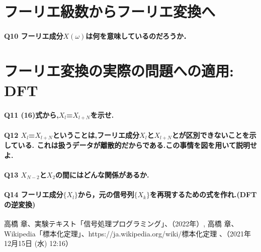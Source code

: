 \documentclass[dvipdfmx,titlepage,a4j]{jsarticle}  %
\begin{document}
\section{フーリエ級数からフーリエ変換へ}
\paragraph{Q10 フーリエ成分$X(\omega)$は何を意味しているのだろうか．}

\section{フーリエ変換の実際の問題への適用: DFT}
\paragraph{Q11 (16)式から,$X_l$=$X_{l+N}$を示せ.}
\paragraph{Q12 $X_l$=$X_{l+N}$ということは,フーリエ成分$X_l$と$X_{l+N}$とが区別できないことを示している.
  これは扱うデータが離散的だからである.この事情を図を用いて説明せよ.}
\paragraph{Q13 $X_{N-2}$と$X_2$の間にはどんな関係があるか.}
\paragraph{Q14 フーリエ成分$\{X_l\}$から，元の信号列$\{X_k\}$を再現するための式を作れ.(DFTの逆変換)}

\begin{thebibliography}{99}
   高橋 章、実験テキスト「信号処理プログラミング」、（2022年）,
   高橋 章、Wikipedia「標本化定理」、{https://ja.wikipedia.org/wiki/標本化定理} 、（2021年12月15日 (水) 12:16）
\end{thebibliography}
\end{document}
